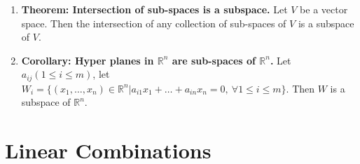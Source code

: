 \documentclass[oneside, 12pt]{book}
\newcommand{\settag}[1]{\renewcommand{\theenumi}{#1}}
\newcommand{\R}{\mathbb{R}}
\begin{document}
\begin{enumerate}
        \settag{1.2.13}
        \item \textbf{Theorem: Intersection of sub-spaces is a subspace.} Let $V$ be a vector space. Then the intersection
         of any collection of sub-spaces of $V$ is a subspace of $V$.
        
        \settag{1.2.14}
        \item \textbf{Corollary: Hyper planes in $\R^n$ are sub-spaces of $\R^n$.} Let $a_{ij}(1\leq i\leq m)$, let
         $W_i = \{(x_1, \ldots, x_n)\in \R^n|a_{i1}x_1 + \ldots + a_{in}x_n = 0,~\forall 1 \leq i \leq m\}$. Then 
         $W$ is a subspace of $\R^n$.
        
    \end{enumerate}
    
\section{Linear Combinations}
\end{document}
